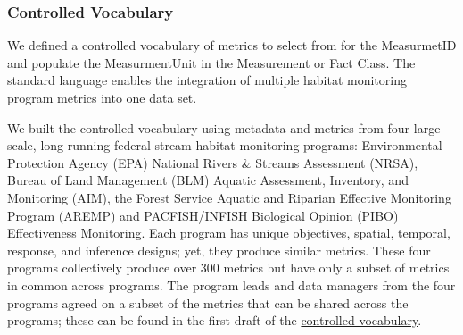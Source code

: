 \documentclass[
]{article}
\begin{document}
\hypertarget{controlled-vocabulary}{%
\subsubsection{Controlled Vocabulary}\label{controlled-vocabulary}}

We defined a controlled vocabulary of metrics to select from for the
MeasurmetID and populate the MeasurmentUnit in the Measurement or Fact
Class. The standard language enables the integration of multiple habitat
monitoring program metrics into one data set.

We built the controlled vocabulary using metadata and metrics from four
large scale, long-running federal stream habitat monitoring programs:
Environmental Protection Agency (EPA) National Rivers \& Streams
Assessment (NRSA), Bureau of Land Management (BLM) Aquatic Assessment,
Inventory, and Monitoring (AIM), the Forest Service Aquatic and Riparian
Effective Monitoring Program (AREMP) and PACFISH/INFISH Biological
Opinion (PIBO) Effectiveness Monitoring. Each program has unique
objectives, spatial, temporal, response, and inference designs; yet,
they produce similar metrics. These four programs collectively produce
over 300 metrics but have only a subset of metrics in common across
programs. The program leads and data managers from the four programs
agreed on a subset of the metrics that can be shared across the
programs; these can be found in the first draft of the
\href{Tables/StandardVocabulary.csv}{controlled vocabulary}.
\end{document}
